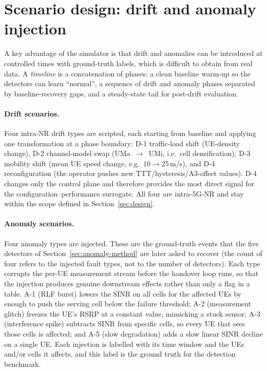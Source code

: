 \section{Scenario design: drift and anomaly injection}
\label{sec:scenarios}

A key advantage of the simulator is that drift and anomalies can be introduced at
controlled times with ground-truth labels, which is difficult to obtain from real
data. A \emph{timeline} is a concatenation of phases: a clean baseline warm-up so the
detectors can learn ``normal'', a sequence of drift and anomaly phases separated
by baseline-recovery gaps, and a steady-state tail for post-drift evaluation.

\paragraph{Drift scenarios.}
Four intra-NR drift types are scripted, each starting from baseline and applying
one transformation at a phase boundary: D-1 traffic-load shift (UE-density
change), D-2 channel-model swap (UMa~$\rightarrow$~UMi, i.e.\ cell
densification), D-3 mobility shift (mean UE speed change, e.g.\ $10\rightarrow25$\,m/s),
and D-4 reconfiguration (the operator pushes new TTT/hysteresis/A3-offset
values). D-4 changes only the control plane and therefore provides the most
direct signal for the configuration--performance surrogate. All four are
intra-5G-NR and stay within the scope defined in Section~\ref{sec:design}.

\paragraph{Anomaly scenarios.}
Four anomaly types are injected. These are the ground-truth events that the five
detectors of Section~\ref{sec:anomaly-method} are later asked to recover (the
count of four refers to the injected fault types, not to the number of
detectors). Each type corrupts the per-UE measurement stream before the handover
loop runs, so that the injection produces genuine downstream effects rather than
only a flag in a table. A-1 (RLF burst) lowers the SINR on all cells for the
affected UEs by enough to push the serving cell below the failure threshold; A-2
(measurement glitch) freezes the UE's RSRP at a constant value, mimicking a stuck
sensor; A-3 (interference spike) subtracts SINR from specific cells, so every UE
that sees those cells is affected; and A-5 (slow degradation) adds a slow linear
SINR decline on a single UE. Each injection is labelled with its time window and
the UEs and/or cells it affects, and this label is the ground truth for the
detection benchmark.

